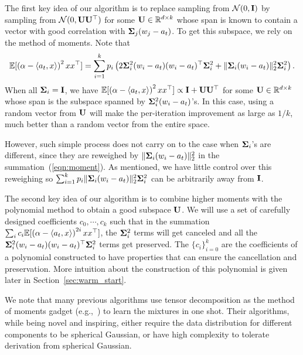 The first key idea of our algorithm is to replace sampling from $\mathcal{N}(0, \bold{I})$ by sampling from $ \mathcal{N}(0, \bold{U} \bold{U}^{\top})$ for some $\bold{U} \in \mathbb{R}^{d \times k}$ whose span is known to contain a vector with good correlation with $\bold{\Sigma}_j (w_j - a_t  )$. To get this subspace, we rely on the method of moments. Note that 
\begin{align} \label{eqn:moment}
\mathbb{E}[\left( \alpha - \langle a_t, x \rangle \right)^2 x x^{\top}] = \sum_{i = 1}^k p_i    \left( 2\bold{\Sigma}^2_i (w_i - a_t  )(w_i - a_t  )^{\top} \bold{\Sigma}_i^2 + \| \bold{\Sigma}_i (w_i-a_t) \|_2^2\bold{\Sigma}_i^2  \right).
\end{align}
When all $\bold{\Sigma}_i = \bold{I}$, we have $\mathbb{E}[\left( \alpha - \langle a_t, x \rangle \right)^2 x x^{\top}]  \propto \bold{I} + \bold{U} \bold{U}^{\top} $ for some $\bold{U} \in  \mathbb{R}^{d \times k}$ whose span is the subspace spanned by $\bold{\Sigma}_i^2 (w_i - a_t  )$'s. In this case, using a random vector from $\bold{U}$ will make the per-iteration improvement as large as $1/k$, much better than a random vector from the entire space. 

However, such simple process does not carry on to the case when $\bold{\Sigma}_i$'s are different, since they are reweighed by $ \| \bold{\Sigma}_i (w_i - a_t  ) \|_2^2  $ in the summation~(\ref{eqn:moment}). As mentioned, we have little control over this reweighing so $\sum_{i= 1}^k p_i \| \bold{\Sigma}_i (w_i-a_t) \|_2^2\bold{\Sigma}_i^2$ can be arbitrarily away from $\bold{I}$. 

The second key idea of our algorithm is to combine higher moments with the polynomial method to obtain a good subspace $\bold{U}$. We will use a set of carefully designed coefficients $c_0, \cdots, c_k$ 
such that in the summation $\sum_i c_i \mathbb{E}[\left( \alpha - \langle a_t, x \rangle \right)^{2i} x x^{\top}]$,  the $\bold{\Sigma}_i^2$ terms will get canceled and all the $\bold{\Sigma}_i^2 (w_i - a_t  )(w_i - a_t  )^{\top} \bold{\Sigma}_i^2 $ terms get preserved. 
The $\{c_i\}_{i=0}^k$ are the coefficients of a polynomial constructed to have properties that can ensure the cancellation and preservation. 
More intuition about the construction of this polynomial is given later in Section~\ref{sec:warm_start}. 

We note that many previous algorithms use tensor decomposition as the method of moments gadget (e.g.,~\citep{sedghi2016provable,zhong2016mixed}) to learn the mixtures in one shot. Their algorithms, while being novel and inspiring, either require the data distribution for different components to be spherical Gaussian, or have high complexity to tolerate derivation from spherical Gaussian.


